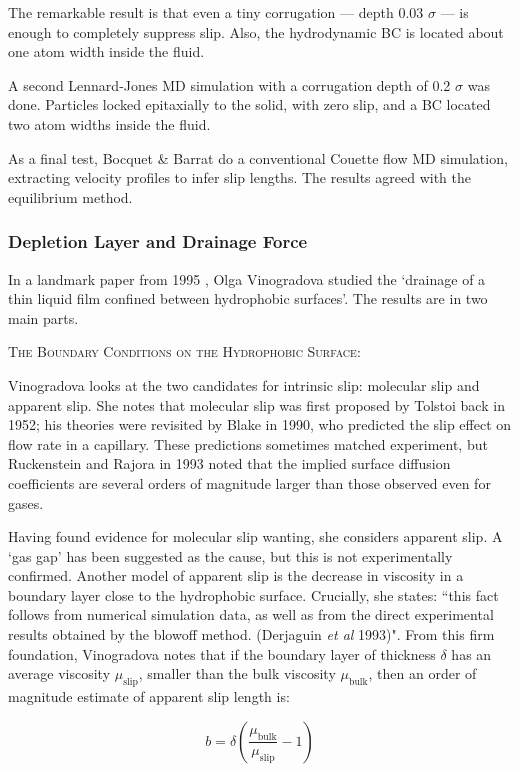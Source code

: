 \documentclass[12pt, a4paper, twoside, openright]{book}
\newcommand{\paper}[1]
         {\colorbox[gray]{0.8}{ \textsc{#1}}
         
         }
\begin{document}
The remarkable result is that even a tiny corrugation --- depth 0.03 $\sigma$ --- is enough to completely suppress slip. Also, the hydrodynamic BC is located about one atom width inside the fluid.

A second Lennard-Jones MD simulation with a corrugation depth of 0.2 $\sigma$ was done.  Particles locked epitaxially to the solid, with zero slip, and a BC located two atom widths inside the fluid.

As a final test, Bocquet \& Barrat do a conventional Couette flow MD simulation, extracting velocity profiles to infer slip lengths. The results agreed with the equilibrium method.


\clearpage
\subsubsection{Depletion Layer and Drainage Force}
In a landmark paper from 1995 \cite{Vinogradova1995}, Olga Vinogradova studied the `drainage of a thin liquid film confined between hydrophobic surfaces'. The results are in two main parts.

\paper{The Boundary Conditions on the Hydrophobic Surface:}
Vinogradova looks at the two candidates for intrinsic slip: molecular slip and apparent slip.
She notes that molecular slip was first proposed by Tolstoi back in 1952; his theories were revisited by Blake in 1990, who predicted the slip effect on flow rate in a capillary.  These predictions sometimes matched experiment, but Ruckenstein and Rajora in 1993 noted that the implied surface diffusion coefficients are several orders of magnitude larger than those observed even for gases.

Having found evidence for molecular slip wanting, she considers apparent slip.  A `gas gap' has been suggested as the cause, but this is not experimentally confirmed. Another model of apparent slip is the decrease in viscosity in a boundary layer close to the hydrophobic surface. Crucially, she states: ``this fact follows from numerical simulation data, as well as from the direct experimental results obtained by the blowoff method. (Derjaguin \emph{et al} 1993)". From this firm foundation, Vinogradova notes that if the boundary layer of thickness $\delta$ has an average viscosity $\mu_{\mathrm{slip}}$, smaller than the bulk viscosity $\mu_{\mathrm{bulk}}$, then an order of magnitude estimate of apparent slip length is:

\begin{equation}
b= \delta \left( \frac{\mu_{\mathrm{bulk}}}{\mu_{\mathrm{slip}}} - 1 \right)
\end{equation}
\end{document}

